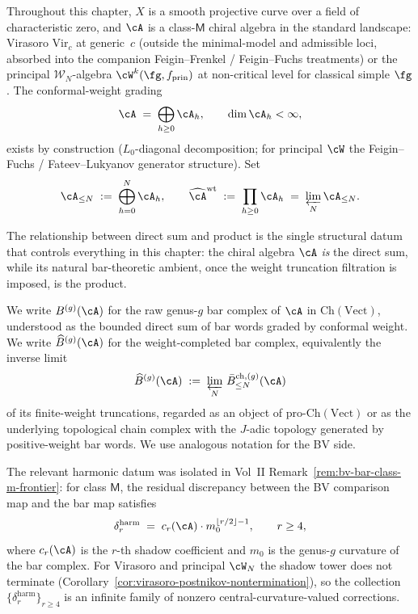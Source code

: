 Throughout this chapter, $X$ is a smooth projective curve over a field
of characteristic zero, and $\cA$ is a class-$\mathsf{M}$ chiral
algebra in the standard landscape: Virasoro $\mathrm{Vir}_c$ at
generic~$c$ \textup{(}outside the minimal-model and admissible loci,
absorbed into the companion Feigin--Frenkel / Feigin--Fuchs
treatments\textup{)} or the principal $\mathcal{W}_N$-algebra
$\cW^k(\fg, f_{\mathrm{prin}})$ at non-critical level for classical
simple $\fg$. The conformal-weight grading
\[
\cA \;=\; \bigoplus_{h \geq 0} \cA_h,
\qquad
\dim \cA_h < \infty,
\]
exists by construction \textup{(}$L_0$-diagonal decomposition; for
principal $\cW$ the Feigin--Fuchs / Fateev--Lukyanov generator
structure\textup{)}. Set
\[
\cA_{\leq N} \;:=\; \bigoplus_{h=0}^{N} \cA_h,
\qquad
\widehat{\cA}^{\mathrm{wt}} \;:=\; \prod_{h \geq 0} \cA_h
\;=\; \varprojlim_N \cA_{\leq N}.
\]

The relationship between direct sum and product is the single structural
datum that controls everything in this chapter: the chiral algebra $\cA$
\emph{is} the direct sum, while its natural bar-theoretic ambient, once
the weight truncation filtration is imposed, is the product.

\begin{notation}
\label{not:chain-versus-limit}
We write $B^{(g)}(\cA)$ for the raw genus-$g$ bar complex of $\cA$ in
$\mathrm{Ch}(\mathrm{Vect})$, understood as the bounded direct sum of
bar words graded by conformal weight. We write $\widehat{B}^{(g)}(\cA)$
for the weight-completed bar complex, equivalently the inverse limit
\[
\widehat{B}^{(g)}(\cA)
\;:=\;
\varprojlim_N \, \bar B^{\mathrm{ch}, (g)}_{\leq N}(\cA)
\]
of its finite-weight truncations, regarded as an object of
$\mathrm{pro}\text{-}\mathrm{Ch}(\mathrm{Vect})$ or as the underlying
topological chain complex with the $J$-adic topology generated by
positive-weight bar words. We use analogous notation for the BV side.
\end{notation}

The relevant harmonic datum was isolated in Vol~II
Remark~\ref{rem:bv-bar-class-m-frontier}: for class $\mathsf{M}$, the
residual discrepancy between the BV comparison map and the bar map
satisfies
\begin{equation}
\label{eq:harmonic-discrepancy}
\delta_r^{\mathrm{harm}}
\;=\;
c_r(\cA) \cdot m_0^{\lfloor r/2 \rfloor - 1},
\qquad r \geq 4,
\end{equation}
where $c_r(\cA)$ is the $r$-th shadow coefficient and $m_0$ is the
genus-$g$ curvature of the bar complex. For Virasoro and principal
$\cW_N$ the shadow tower does not terminate
\textup{(}Corollary~\textup{\ref{cor:virasoro-postnikov-nontermination}}\textup{)},
so the collection $\{\delta_r^{\mathrm{harm}}\}_{r \geq 4}$ is an
infinite family of nonzero central-curvature-valued corrections.

